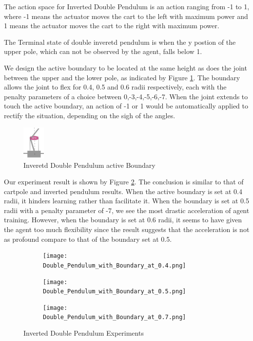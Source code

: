\documentclass[journal]{IEEEtran}
\begin{document}
The action space for Inverted Double Pendulum is an action ranging from -1 to 1, where -1 means the actuator moves the cart to the left with maximum power and 1 means the actuator moves the cart to the right with maximum power.

The Terminal state of double inveretd pendulum is when the y postion of the upper pole, which can not be observed by the agent, falls below 1.

We design the active boundary to be located at the same height as does the joint between the upper and the lower pole, as indicated by Figure \ref{fig:doublePB}. The boundary allows the joint to flex for 0.4, 0.5 and 0.6 radii respectively, each with the penalty parameters of a choice between 0,-3,-4,-5,-6,-7. When the joint extends to touch the active boundary, an action of -1 or 1 would be automatically applied to rectify the situation, depending on the sigh of the angles.

\begin{figure}
     \centering
      \includegraphics[width=0.1\textwidth]{cartpole2.png}
      \caption{Inveretd Double Pendulum active Boundary}
      \label{fig:doublePB}
\end{figure}

Our experiment result is shown by Figure \ref{fig:Double Pendulum}. The conclusion is similar to that of cartpole and inverted pendulum results. When the active boundary is set at 0.4 radii, it hinders learning rather than facilitate it. When the boundary is set at 0.5 radii with a penalty parameter of -7, we see the most drastic acceleration of agent training. However, when the boundary is set at 0.6 radii, it seems to have given the agent too much flexibility since the result suggests that the acceleration is not as profound compare to that of the boundary set at 0.5.

\begin{figure}
    \centering
    \begin{subfigure}[b]{0.5\textwidth}
      \centering
      \texttt{[image: Double\_Pendulum\_with\_Boundary\_at\_0.4.png]}
    \end{subfigure}
    \vspace*{0.0mm}
    \begin{subfigure}[b]{0.5\textwidth}
      \centering
      \texttt{[image: Double\_Pendulum\_with\_Boundary\_at\_0.5.png]}
    \end{subfigure}
    \vspace*{0.0mm}
    \begin{subfigure}[b]{0.5\textwidth}
      \centering
      \texttt{[image: Double\_Pendulum\_with\_Boundary\_at\_0.7.png]}
    \end{subfigure}
    \caption{Inverted Double Pendulum Experiments}
    \label{fig:Double Pendulum}
\end{figure}
\end{document}
